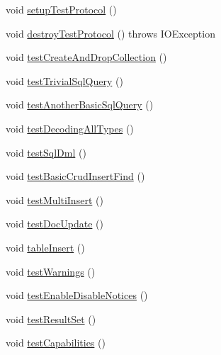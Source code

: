 \begin{DoxyCompactItemize}
\item 
void \mbox{\hyperlink{classtestsuite_1_1x_1_1internal_1_1_x_protocol_test_a69bd51b1d4a59bdd2cb70040e1afabed}{setup\+Test\+Protocol}} ()
\item 
void \mbox{\hyperlink{classtestsuite_1_1x_1_1internal_1_1_x_protocol_test_a8387294ee6ba1c7333fc3d03bd8fbe65}{destroy\+Test\+Protocol}} ()  throws I\+O\+Exception 
\item 
void \mbox{\hyperlink{classtestsuite_1_1x_1_1internal_1_1_x_protocol_test_a650f7b5f38eedab82e4ef98ce22cf095}{test\+Create\+And\+Drop\+Collection}} ()
\item 
void \mbox{\hyperlink{classtestsuite_1_1x_1_1internal_1_1_x_protocol_test_a8127d02ed98a47d15c02414eae564339}{test\+Trivial\+Sql\+Query}} ()
\item 
void \mbox{\hyperlink{classtestsuite_1_1x_1_1internal_1_1_x_protocol_test_a4a1b41f5a9bb40d72f5fd071084f8851}{test\+Another\+Basic\+Sql\+Query}} ()
\item 
void \mbox{\hyperlink{classtestsuite_1_1x_1_1internal_1_1_x_protocol_test_aa1933ade962788c0bd42298b441e69cb}{test\+Decoding\+All\+Types}} ()
\item 
void \mbox{\hyperlink{classtestsuite_1_1x_1_1internal_1_1_x_protocol_test_a658d506d430cf1654fe86169440bd2a2}{test\+Sql\+Dml}} ()
\item 
void \mbox{\hyperlink{classtestsuite_1_1x_1_1internal_1_1_x_protocol_test_acf515db649686bb83c84e465bcaf2042}{test\+Basic\+Crud\+Insert\+Find}} ()
\item 
void \mbox{\hyperlink{classtestsuite_1_1x_1_1internal_1_1_x_protocol_test_ad3f86abbe7f82db458009ab7d5c9722d}{test\+Multi\+Insert}} ()
\item 
void \mbox{\hyperlink{classtestsuite_1_1x_1_1internal_1_1_x_protocol_test_a91aa05d58356ce2a66b25b9754950a9b}{test\+Doc\+Update}} ()
\item 
void \mbox{\hyperlink{classtestsuite_1_1x_1_1internal_1_1_x_protocol_test_a4b1f929b40ce724506a6671f46917204}{table\+Insert}} ()
\item 
void \mbox{\hyperlink{classtestsuite_1_1x_1_1internal_1_1_x_protocol_test_a6f54c8fce78c6b4a5b499b75fb12a897}{test\+Warnings}} ()
\item 
void \mbox{\hyperlink{classtestsuite_1_1x_1_1internal_1_1_x_protocol_test_a4fdf5f8b9d2e733db22b09e38b240eb5}{test\+Enable\+Disable\+Notices}} ()
\item 
void \mbox{\hyperlink{classtestsuite_1_1x_1_1internal_1_1_x_protocol_test_adbaeaa413b4fecde68b32c0c8d609ddc}{test\+Result\+Set}} ()
\item 
void \mbox{\hyperlink{classtestsuite_1_1x_1_1internal_1_1_x_protocol_test_ac51527155cb0b1a12790c658a10648b3}{test\+Capabilities}} ()
\end{DoxyCompactItemize}
